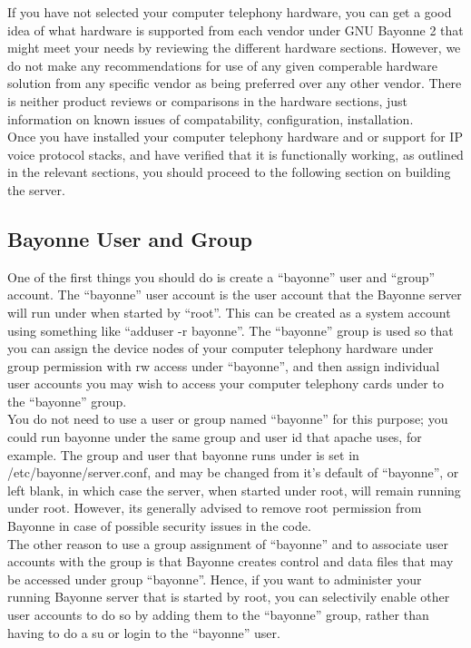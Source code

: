 \documentclass[a4paper,12pt]{article}
\begin{document}
If you have not selected your computer telephony hardware, you can get a
good idea of what hardware is supported from each vendor under GNU
Bayonne 2 that might meet your needs by reviewing the different hardware
sections. However, we do not make any recommendations for use of any
given comperable hardware solution from any specific vendor as being
preferred over any other vendor.  There is neither product reviews or
comparisons in the hardware sections, just information on known issues
of compatability, configuration, installation. \\

Once you have installed your computer telephony hardware and or support for
IP voice protocol stacks, and have verified that it is functionally working,
as outlined in the relevant sections, you should proceed to the following
section on building the server. \\

\subsection{Bayonne User and Group}

One of the first things you should do is create a ``bayonne'' user and
``group'' account.  The ``bayonne'' user account is the user account
that the Bayonne server will run under when started by ``root''.  This
can be created as a system account using something like ``adduser -r
bayonne''.  The ``bayonne'' group is used so that you can assign the
device nodes of your computer telephony hardware under group permission
with rw access under ``bayonne'', and then assign individual user
accounts you may wish to access your computer telephony cards under to
the ``bayonne'' group. \\

You do not need to use a user or group named ``bayonne'' for this
purpose; you could run bayonne under the same group and user id that
apache uses, for example.  The group and user that bayonne runs under
is set in /etc/bayonne/server.conf, and may be changed from it's default
of ``bayonne'', or left blank, in which case the server, when started
under root, will remain running under root.  However, its generally
advised to remove root permission from Bayonne in case of possible
security issues in the code. \\

The other reason to use a group assignment of ``bayonne'' and to
associate user accounts with the group is that Bayonne creates control
and data files that may be accessed under group ``bayonne''.  Hence,
if you want to administer your running Bayonne server that is started by
root, you can selectivily enable other user accounts to do so by adding
them to the ``bayonne'' group, rather than having to do a su or login to
the ``bayonne'' user. \\
\end{document}
